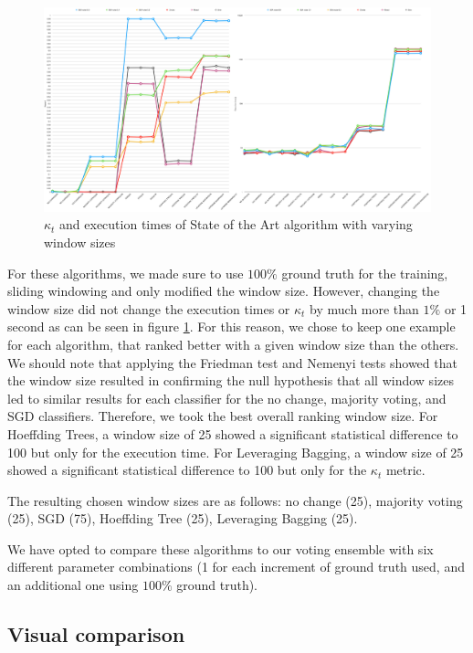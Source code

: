 \begin{figure}
  \includegraphics[width=\linewidth]{./images/chapter5/compare_sota}
\caption{\label{fig:raw_compare_sota}$\kappa_t$ and execution times of State of the Art algorithm with varying window sizes}
\end{figure}

For these algorithms, we made sure to use $100\%$ ground truth for the training, sliding windowing and only modified the window size. However, changing the window size did not change the execution times or $\kappa_t$ by much more than $1\%$ or 1 second as can be seen in figure \ref{fig:raw_compare_sota}. For this reason, we chose to keep one example for each algorithm, that ranked better with a given window size than the others. We should note that applying the Friedman test and Nemenyi tests showed that the window size resulted in confirming the null hypothesis that all window sizes led to similar results for each classifier for the no change, majority voting, and SGD classifiers. Therefore, we took the best overall ranking window size. For Hoeffding Trees, a window size of 25 showed a significant statistical difference to 100 but only for the execution time. For Leveraging Bagging, a window size of 25 showed a significant statistical difference to 100 but only for the $\kappa_t$ metric.

The resulting chosen window sizes are as follows: no change (25),  majority voting (25), SGD (75), Hoeffding Tree (25), Leveraging Bagging (25).

We have opted to compare these algorithms to our voting ensemble with six different parameter combinations (1 for each increment of ground truth used, and an additional one using $100\%$ ground truth).


\subsection{Visual comparison}

